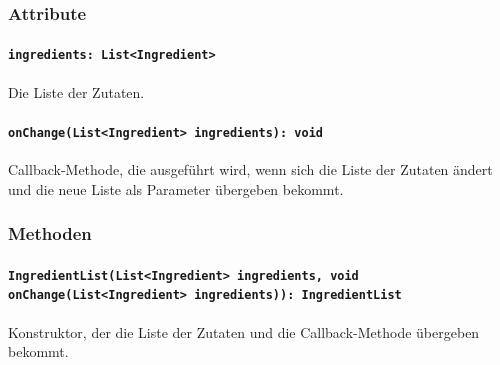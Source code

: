 \documentclass{entwurfsheft}
\begin{document}
\subsubsection*{Attribute}
\paragraph{\texttt{ingredients: List<Ingredient>}}
Die Liste der Zutaten.
\paragraph{\texttt{onChange(List<Ingredient> ingredients): void}}
Callback-Methode, die ausgeführt wird, wenn sich die Liste der Zutaten ändert und die neue Liste als Parameter übergeben bekommt.
\subsubsection*{Methoden}
\paragraph{\texttt{IngredientList(List<Ingredient> ingredients, void onChange(List<Ingredient> ingredients)): IngredientList}}
Konstruktor, der die Liste der Zutaten und die Callback-Methode übergeben bekommt.
\newpage
\end{document}
